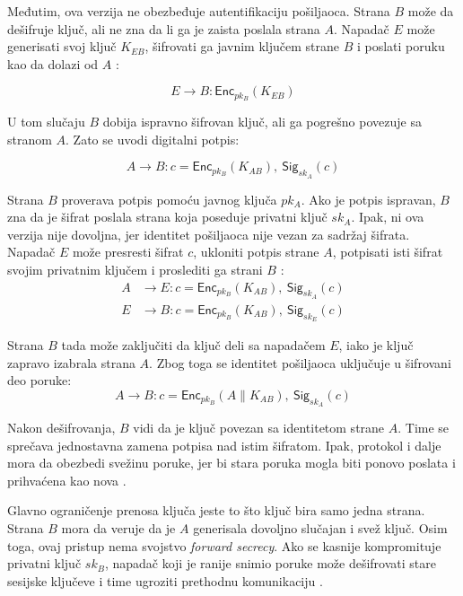 Međutim, ova verzija ne obezbeđuje autentifikaciju pošiljaoca. Strana \(B\) može da dešifruje ključ, ali ne zna da li ga je zaista poslala strana \(A\). Napadač \(E\) može generisati svoj ključ \(K_{EB}\), šifrovati ga javnim ključem strane \(B\) i poslati poruku kao da dolazi od \(A\) \cite{smart2016cryptography}:

\[
E \rightarrow B : \mathsf{Enc}_{pk_B}(K_{EB})
\]

U tom slučaju \(B\) dobija ispravno šifrovan ključ, ali ga pogrešno povezuje sa stranom \(A\). Zato se uvodi digitalni potpis:

\[
A \rightarrow B : c = \mathsf{Enc}_{pk_B}(K_{AB}),\ \mathsf{Sig}_{sk_A}(c)
\]

Strana \(B\) proverava potpis pomoću javnog ključa \(pk_A\). Ako je potpis ispravan, \(B\) zna da je šifrat poslala strana koja poseduje privatni ključ \(sk_A\). Ipak, ni ova verzija nije dovoljna, jer identitet pošiljaoca nije vezan za sadržaj šifrata. Napadač \(E\) može presresti šifrat \(c\), ukloniti potpis strane \(A\), potpisati isti šifrat svojim privatnim ključem i proslediti ga strani \(B\) \cite{smart2016cryptography}:
\[
\begin{aligned}
A &\rightarrow E : c = \mathsf{Enc}_{pk_B}(K_{AB}),\ \mathsf{Sig}_{sk_A}(c) \\
E &\rightarrow B : c = \mathsf{Enc}_{pk_B}(K_{AB}),\ \mathsf{Sig}_{sk_E}(c)
\end{aligned}
\]

Strana \(B\) tada može zaključiti da ključ deli sa napadačem \(E\), iako je ključ zapravo izabrala strana \(A\). Zbog toga se identitet pošiljaoca uključuje u šifrovani deo poruke:
\[
A \rightarrow B : c = \mathsf{Enc}_{pk_B}(A \parallel K_{AB}),\ \mathsf{Sig}_{sk_A}(c)
\]

Nakon dešifrovanja, \(B\) vidi da je ključ povezan sa identitetom strane \(A\). Time se sprečava jednostavna zamena potpisa nad istim šifratom. Ipak, protokol i dalje mora da obezbedi svežinu poruke, jer bi stara poruka mogla biti ponovo poslata i prihvaćena kao nova \cite{smart2016cryptography}.

Glavno ograničenje prenosa ključa jeste to što ključ bira samo jedna strana. Strana \(B\) mora da veruje da je \(A\) generisala dovoljno slučajan i svež ključ. Osim toga, ovaj pristup nema svojstvo \emph{forward secrecy}. Ako se kasnije kompromituje privatni ključ \(sk_B\), napadač koji je ranije snimio poruke može dešifrovati stare sesijske ključeve i time ugroziti prethodnu komunikaciju \cite{smart2016cryptography}.

